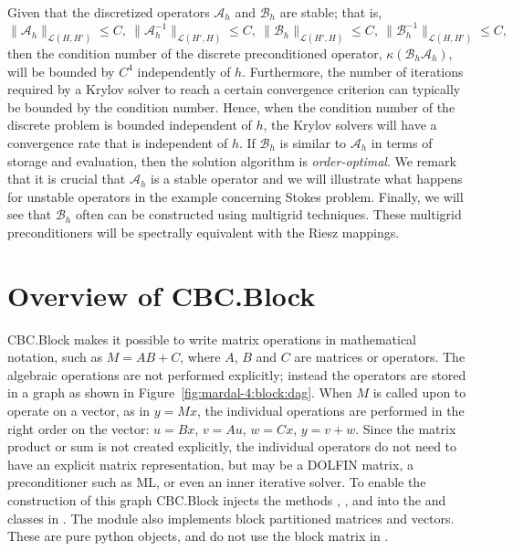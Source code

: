 Given that the discretized operators  $\mathcal{A}_h$ and $\mathcal{B}_h$ are stable; that is,
 \begin{equation}
\|\mathcal{A}_h\|_{\mathcal{L} (H, H')} \le C, \ \|\mathcal{A}_h^{-1}\|_{\mathcal{L} (H', H)} \le C, \
\|\mathcal{B}_h\|_{\mathcal{L}(H', H)} \le C,  \  \|\mathcal{B}_h^{-1}\|_{\mathcal{L}(H, H')} \le C,
\end{equation}
then the condition number of the discrete preconditioned operator,
$\kappa(\mathcal{B}_h \mathcal{A}_h)$, will be bounded by $C^4$
independently of $h$.  Furthermore, the number of iterations required
by a Krylov solver to reach a certain convergence criterion can
typically be bounded by the condition number. Hence, when the
condition number of the discrete problem is bounded independent of
$h$, the Krylov solvers will have a convergence rate that is
independent of $h$.  If $\mathcal{B}_h$ is similar to $\mathcal{A}_h$
in terms of storage and evaluation, then the solution algorithm
is \emph{order-optimal}.  We remark that it is crucial that
$\mathcal{A}_h$ is a stable operator and we will illustrate what
happens for unstable operators in the example concerning Stokes
problem.  Finally, we will see that $\mathcal{B}_h$ often can be
constructed using multigrid techniques. These multigrid
preconditioners will be spectrally equivalent with the Riesz mappings.

\enlargethispage{12pt}

\vspace*{-6pt}\section{Overview of CBC.Block}

CBC.Block makes it possible to write matrix operations in mathematical notation, such as $M = A B+C$, where $A$, $B$ and $C$ are matrices or operators. The algebraic operations are not performed explicitly; instead the operators are stored in a graph as shown in Figure~\ref{fig:mardal-4:block:dag}. When $M$ is called upon to operate on a vector, as in $y=Mx$, the individual operations are performed in the right order on the vector: $u=Bx$, $v=Au$, $w=Cx$, $y=v+w$. Since the matrix product or sum is not created explicitly, the individual operators do not need to have an explicit matrix representation, but  may be a DOLFIN matrix, a preconditioner such as ML, or even an inner iterative solver.
To enable the construction of this graph CBC.Block injects the
methods , , and 
into the \emp{Matrix} and \emp{Vector} classes in \dolfin.  The module
also implements block partitioned matrices and vectors. These are pure
python objects, and do not use the block matrix in \dolfin.

